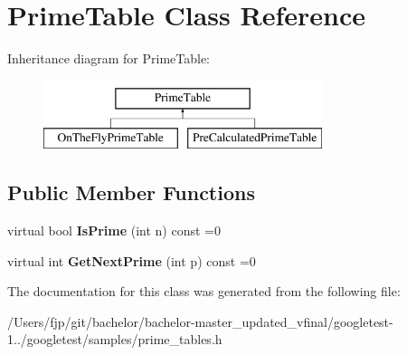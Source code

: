 \hypertarget{class_prime_table}{}\section{Prime\+Table Class Reference}
\label{class_prime_table}
Inheritance diagram for Prime\+Table\+:\begin{figure}[H]
\begin{center}
\leavevmode
\includegraphics[height=2.000000cm]{class_prime_table}
\end{center}
\end{figure}
\subsection*{Public Member Functions}
\begin{DoxyCompactItemize}
\item 
\mbox{\label{class_prime_table_a2ab9243364ded0c51541f641b2df362a}} 
virtual bool {\bfseries Is\+Prime} (int n) const =0
\item 
\mbox{\label{class_prime_table_ae537c939f56617d8937d57bbbae3ab30}} 
virtual int {\bfseries Get\+Next\+Prime} (int p) const =0
\end{DoxyCompactItemize}


The documentation for this class was generated from the following file\+:\begin{DoxyCompactItemize}
\item 
/\+Users/fjp/git/bachelor/bachelor-\/master\+\_\+updated\+\_\+vfinal/googletest-\/1../googletest/samples/prime\+\_\+tables.\+h\end{DoxyCompactItemize}
